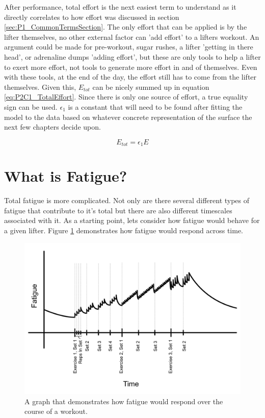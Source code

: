 After performance, total effort is the next easiest term to understand as it directly correlates to how effort was discussed in section \ref{sec:P1_CommonTermsSection}. The only effort that can be applied is by the lifter themselves, no other external factor can 'add effort' to a lifters workout. An argument could be made for pre-workout, sugar rushes, a lifter 'getting in there head', or adrenaline dumps 'adding effort', but these are only tools to help a lifter to exert more effort, not tools to generate more effort in and of themselves. Even with these tools, at the end of the day, the effort still has to come from the lifter themselves. Given this, $E_{tot}$ can be nicely summed up in equation \ref{eq:P2C1_TotalEffort}. Since there is only one source of effort, a true equality sign can be used. $\epsilon_1$ is a constant that will need to be found after fitting the model to the data based on whatever concrete representation of the surface the next few chapters decide upon.

\begin{equation}
	\label{eq:P2C1_TotalEffort}
	E_{tot}=\epsilon_1 E
\end{equation}


\section{What is Fatigue?}
\label{sec:P2C1_WhatIsFatigue}

Total fatigue is more complicated. Not only are there several different types of fatigue that contribute to it's total but there are also different timescales associated with it. As a starting point, lets consider how fatigue would behave for a given lifter. Figure \ref{fig:P2C1_GlobalFatigueGraph} demonstrates how fatigue would respond across time.

\begin{figure}[htb]
    \centering
    \includegraphics[scale=0.55]{images/ch2/FatigueGraph.png}
    \caption{A graph that demonstrates how fatigue would respond over the course of a workout.}
    \label{fig:P2C1_GlobalFatigueGraph}
\end{figure}

